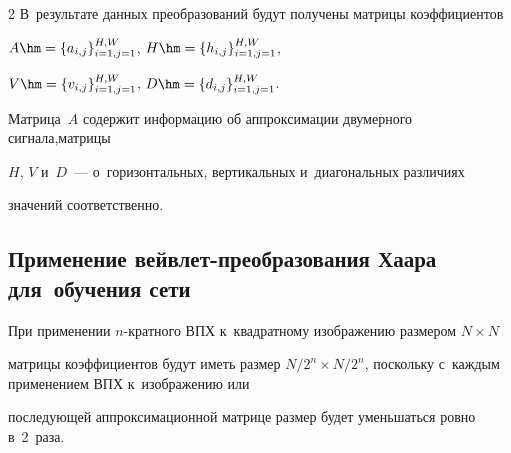 \begin{multicols}{2}
В~результате данных преобразований будут получены матрицы коэффициентов


$A \hm= \{a_{i,j}\}_{i=1, j=1}^{H, W}$, $H \hm= \{h_{i,j}\}_{i=1, j=1}^{H, W}$,


$V \hm= \{v_{i,j}\}_{i=1, j=1}^{H, W}$, $D \hm= \{d_{i,j}\}_{i=1, j=1}^{H, W}$. 


Матрица~$A$ содержит ин\-фор\-мацию об аппроксимации двумерного сигнала,\linebreak мат\-ри\-цы 


$H$, $V$ и~$D$~--- о~горизонтальных, вертикальных и~диагональных различиях 


значений со\-от\-вет\-ст\-венно.





\subsection{Применение вейвлет-преобразования Хаара для~обучения сети}





При применении $n$-кратного ВПХ к~квадратному изображению размером $N \times N$ 


матрицы коэффициентов будут иметь размер ${N}/2^{n} \times 


{N}/{2^{n}}$, \mbox{поскольку} с~каждым применением ВПХ к~изоб\-ра\-же\-нию или 


последующей аппроксимационной мат\-ри\-це размер будет уменьшаться ровно в~2~раза.\linebreak\vspace*{-12pt}





\pagebreak





\end{multicols}





